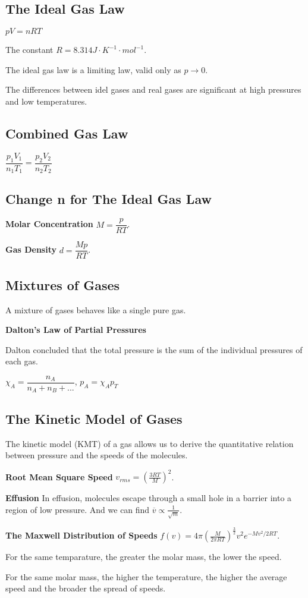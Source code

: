 \documentclass[a4paper,12pt]{article}
\begin{document}
\subsection{The Ideal Gas Law}
\begin{center}
$pV=nRT$
\end{center}\par
The constant $R = 8.314 J\cdot K^{-1}\cdot mol^{-1}$.\par
The ideal gas law is a limiting law, valid only as $p\rightarrow0$.\par
The differences between idel gases and real gases are significant at high pressures and low temperatures.
\subsection{Combined Gas Law}
\begin{center}
$\dfrac{p_{1}V_{1}}{n_{1}T_{1}}=\dfrac{p_{2}V_{2}}{n_{2}T_{2}}$
\end{center}
\subsection{Change n for The Ideal Gas Law}
\textbf{Molar Concentration} $M=\dfrac{p}{RT}$.\par
\textbf{Gas Density} $d=\dfrac{Mp}{RT}$.
\subsection{Mixtures of Gases}
A mixture of gases behaves like a single pure gas.\par
\textbf{Dalton's Law of Partial Pressures}\par
Dalton concluded that the total pressure is the sum of the individual pressures of each gas.
\begin{center}
$\chi_{A}=\dfrac{n_{A}}{n_{A}+n_{B}+...}$, $p_{A}=\chi_{A}p_{T}$
\end{center}
\subsection{The Kinetic Model of Gases}
The kinetic model (KMT) of a gas allows us to derive the quantitative relation between pressure and the speeds of the molecules.\par
\textbf{Root Mean Square Speed} $v_{rms}=(\frac{3RT}{M})^{2}$.\par
\textbf{Effusion} In effusion, molecules escape through a small hole in a barrier into a region of low pressure. And we can find $\overline{v}\propto \frac{1}{\sqrt{m}}$.\par
\textbf{The Maxwell Distribution of Speeds} $f(v)=4\pi (\frac{M}{2\pi RT})^{\frac{3}{2}}v^{2}e^{-Mv^{2}/2RT}$.\par
For the same temparature, the greater the molar mass, the lower the speed.\par
For the same molar mass, the higher the temperature, the higher the average speed and the broader the spread of speeds.
\end{document}
